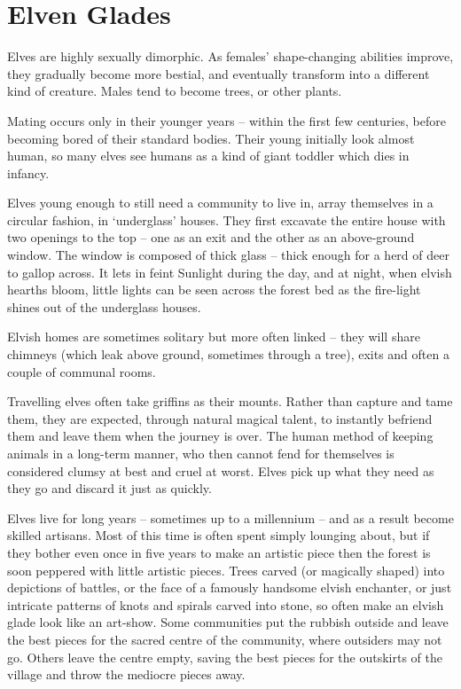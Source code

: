 \section[Elves]{Elven Glades \El}
\label{elvenGlades}


\begin{multicols}{2}
\renewcommand\npcsymbol{\El}

\noindent
Elves are highly sexually dimorphic.
As females' shape-changing abilities improve, they gradually become more bestial, and eventually transform into a different kind of creature.
Males tend to become trees, or other plants.

Mating occurs only in their younger years -- within the first few centuries, before becoming bored of their standard bodies.
Their young initially look almost human, so many elves see humans as a kind of giant toddler which dies in infancy.

Elves young enough to still need a community to live in, array themselves in a circular fashion, in `underglass' houses.
They first excavate the entire house with two openings to the top -- one as an exit and the other as an above-ground window.
The window is composed of thick glass -- thick enough for a herd of deer to gallop across.
It lets in feint Sunlight during the day, and at night, when elvish hearths bloom, little lights can be seen across the forest bed as the fire-light shines out of the underglass houses.

Elvish homes are sometimes solitary but more often linked -- they will share chimneys (which leak above ground, sometimes through a tree), exits and often a couple of communal rooms.

Travelling elves often take griffins as their mounts. Rather than capture and tame them, they are expected, through natural magical talent, to instantly befriend them and leave them when the journey is over. The human method of keeping animals in a long-term manner, who then cannot fend for themselves is considered clumsy at best and cruel at worst. Elves pick up what they need as they go and discard it just as quickly.

Elves live for long years -- sometimes up to a millennium -- and as a result become skilled artisans.
Most of this time is often spent simply lounging about, but if they bother even once in five years to make an artistic piece then the forest is soon peppered with little artistic pieces.
Trees carved (or magically shaped) into depictions of battles, or the face of a famously handsome elvish enchanter, or just intricate patterns of knots and spirals carved into stone, so often make an elvish glade look like an art-show.
Some communities put the rubbish outside and leave the best pieces for the sacred centre of the community, where outsiders may not go.
Others leave the centre empty, saving the best pieces for the outskirts of the village and throw the mediocre pieces away.


\end{multicols}
